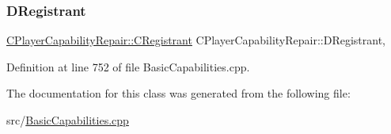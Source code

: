 \subsubsection{\texorpdfstring{D\+Registrant}{DRegistrant}}
{\footnotesize\ttfamily \hyperlink{classCPlayerCapabilityRepair_1_1CRegistrant}{C\+Player\+Capability\+Repair\+::\+C\+Registrant} C\+Player\+Capability\+Repair\+::\+D\+Registrant\hspace{0.3cm}{\ttfamily [static]}, {\ttfamily [protected]}}



Definition at line 752 of file Basic\+Capabilities.\+cpp.



The documentation for this class was generated from the following file\+:\begin{DoxyCompactItemize}
\item 
src/\hyperlink{BasicCapabilities_8cpp}{Basic\+Capabilities.\+cpp}\end{DoxyCompactItemize}
